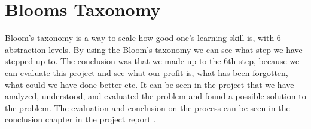 \section{Blooms Taxonomy}
Bloom's taxonomy is a way to scale how good one's learning skill is, with 6 abstraction levels.
By using the Bloom's taxonomy we can see what step we have stepped up to. The conclusion was that we made up to the 6th step, because we can evaluate this project and see what our profit is, what has been forgotten, what could we have done better etc. It can be seen in the project that we have analyzed, understood, and evaluated the problem and found a possible solution to the problem. The evaluation and conclusion on the process can be seen in the conclusion chapter in the project report .